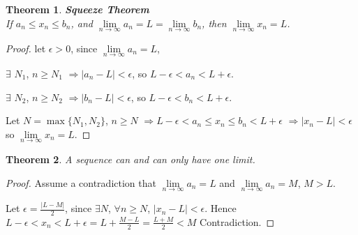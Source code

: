 \documentclass[12pt]{article}
\newcommand{\abs}[1]{\left| #1 \right|}
\theoremstyle{plain}
\newtheorem{theorem}{Theorem}[subsection]
\newcommand{\dlim}{\displaystyle\lim\limits}
\begin{document}
    \newpage
    {\color{Blue}
    \begin{theorem}{\textbf{Squeeze Theorem} \\}
        If $a_n \leq x_n\leq b_n$, and 
        $\dlim_{n\to\infty} a_n= L = \dlim_{n\to\infty}b_n$, 
        then $\dlim_{n\to\infty} x_n = L$. 
    \end{theorem}
    \begin{proof}
        let $\epsilon > 0$, since $\dlim_{n\to\infty} a_n = L$, 

        $\exists \,\,N_1$, $n\geq N_1$ $\Rightarrow \abs{a_n-L} < \epsilon$,
        so $L-\epsilon < a_n< L+\epsilon$.

        $\exists \,\,N_2$, $n\geq N_2$ $\Rightarrow \abs{b_n-L} < \epsilon$,
        so $L-\epsilon < b_n< L+\epsilon$.
        
        Let $N = \max\{N_1, N_2\}$, $n\geq N$ 
        $\Rightarrow L -\epsilon < a_n\leq x_n\leq b_n<L+\epsilon$ 
        $\Rightarrow \abs{x_n-L}<\epsilon$ so $\dlim_{n\to\infty} x_n=L$.
    \end{proof}}

    \begin{theorem}
        A sequence can and can only have one limit.
    \end{theorem}
    \begin{proof}
        Assume a contradiction that $\dlim_{n\to\infty} a_n = L$
            and $\dlim_{n\to\infty} a_n = M$, $M>L$.

        Let $\epsilon = \frac{\abs{L-M}}2$, since $\exists N$, $\forall n\geq N$,
        $\abs{x_n-L}<\epsilon$. Hence 
        $L-\epsilon < x_n < L+\epsilon =L+\frac{M-L}2 =\frac{L+M}2<M$ 
        Contradiction.                
    \end{proof}
\end{document}
